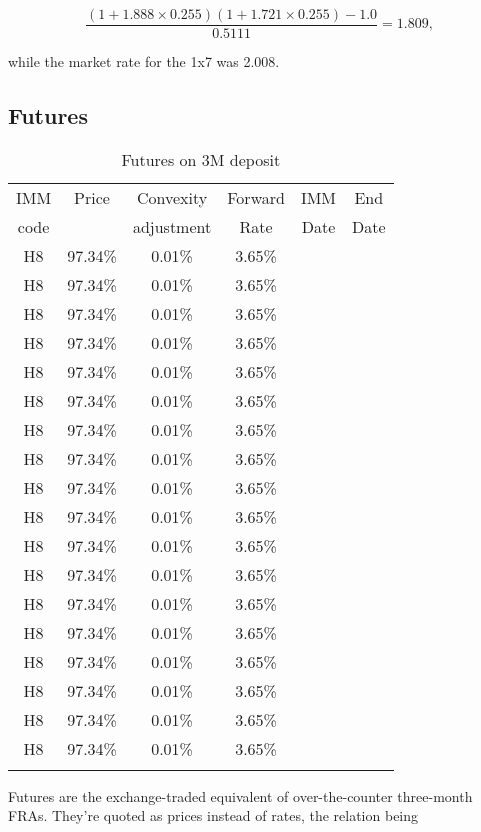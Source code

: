 \documentclass[11pt,reqno]{amsart}
\begin{document}
\begin{equation}
\frac{
    \left( 1 + 1.888 \times 0.255\right)
    \left( 1 + 1.721 \times 0.255\right)
    - 1.0
}{
    0.5111
}=1.809,
\label{eqn:FRAarbitrage}
\end{equation}

while the market rate for the 1x7 was 2.008.

\subsection{Futures}

\begin{table}[tbp]
\label{tab:futures} 
\begin{tabular}{cccccc}
IMM  & Price & Convexity  & Forward & IMM  & End  \\
code &       & adjustment & Rate    & Date & Date \\ 
H8 & 97.34\% & 0.01\% & 3.65\% &  &  \\ 
H8 & 97.34\% & 0.01\% & 3.65\% &  &  \\ 
H8 & 97.34\% & 0.01\% & 3.65\% &  &  \\ 
H8 & 97.34\% & 0.01\% & 3.65\% &  &  \\ 
H8 & 97.34\% & 0.01\% & 3.65\% &  &  \\ 
H8 & 97.34\% & 0.01\% & 3.65\% &  &  \\ 
H8 & 97.34\% & 0.01\% & 3.65\% &  &  \\ 
H8 & 97.34\% & 0.01\% & 3.65\% &  &  \\ 
H8 & 97.34\% & 0.01\% & 3.65\% &  &  \\ 
H8 & 97.34\% & 0.01\% & 3.65\% &  &  \\ 
H8 & 97.34\% & 0.01\% & 3.65\% &  &  \\ 
H8 & 97.34\% & 0.01\% & 3.65\% &  &  \\ 
H8 & 97.34\% & 0.01\% & 3.65\% &  &  \\ 
H8 & 97.34\% & 0.01\% & 3.65\% &  &  \\ 
H8 & 97.34\% & 0.01\% & 3.65\% &  &  \\ 
H8 & 97.34\% & 0.01\% & 3.65\% &  &  \\ 
H8 & 97.34\% & 0.01\% & 3.65\% &  &  \\ 
H8 & 97.34\% & 0.01\% & 3.65\% &  &  \\ 
&  &  &  &  & 
\end{tabular}%
\caption{Futures on 3M deposit}
\end{table}

Futures are the exchange-traded equivalent of over-the-counter
three-month FRAs.  They're quoted as prices instead of rates, the relation being
\end{document}
